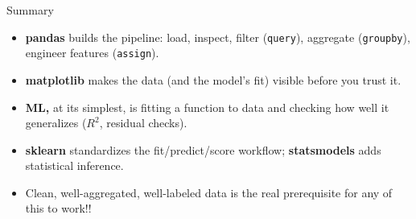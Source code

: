 \documentclass[11pt,aspectratio=43]{beamer}
\begin{document}
\begin{frame}{Summary}
\begin{itemize}
  \item \textbf{pandas} builds the pipeline: load, inspect, filter (\texttt{query}), aggregate (\texttt{groupby}), engineer features (\texttt{assign}).
  \item \textbf{matplotlib} makes the data (and the model's fit) visible before you trust it.
  \item \textbf{ML,} at its simplest, is fitting a function to data and checking how well it generalizes ($R^2$, residual checks).
  \item \textbf{sklearn} standardizes the fit/predict/score workflow; \textbf{statsmodels} adds statistical inference.
  \item Clean, well-aggregated, well-labeled data is the real prerequisite for any of this to work!!
\end{itemize}
\end{frame}
\end{document}
